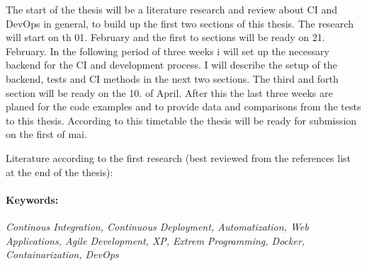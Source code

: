 The start of the thesis will be a literature research and review about CI and DevOps in general, to build up the first two sections of this
thesis. The research will start on th 01. February and the first to sections will be ready on 21. February. In the following period
of three weeks i will set up the necessary backend for the CI and development process. I will describe the setup of the backend, tests and
CI methods in the next two sections. The third and forth section will be ready on the 10. of April. After this the last three weeks are
planed for the code examples and to provide data and comparisons from the tests to this thesis. According to this timetable the thesis will
be ready for submission on the first of mai.

Literature according to the first research (best reviewed from the references list at the end of the thesis):

\cite{meyer2014continuous}
\cite{schaefer2013continuous}
\cite{humble2010continuous}
\cite{fowler2006continuous}
\cite{fowler2012continuous}
\cite{duvall2007continuous}
\cite{stolberg2009enabling}
\cite{humble2010continuous}
\cite{staahl2014modeling}
\cite{maurer2002extreme}
\cite{hansen2015continuous}
\cite{pasquali2015deploying}
\cite{turnbull2014docker}
\cite{raj2015learning}
\cite{astels2003test}
\cite{beck2003test}
\cite{maximilien2003assessing}
\cite{janzen2005test}

\paragraph{Keywords:}
\textit{Continous Integration, Continuous Deployment, Automatization, Web Applications, Agile Development, XP, Extrem Programming, Docker, Containarization, DevOps }
